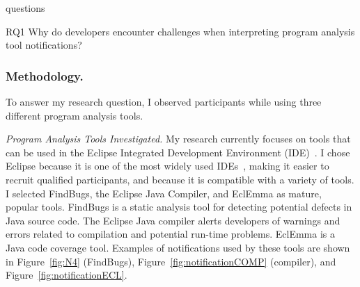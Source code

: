 \documentclass{llncs}
\begin{document}
\begin{labeling}{questions}
	\item [RQ1] Why do developers encounter challenges when interpreting program analysis tool notifications? 
\end{labeling}



\subsubsection{Methodology.} To answer my research question, I observed participants while using three different program analysis tools.

\vspace{0.5em}
\noindent\textit{Program Analysis Tools Investigated.}
My research currently focuses on tools that can be used in the Eclipse Integrated Development Environment (IDE)~\cite{EclipseIDE}. I chose Eclipse because it is one of the most widely used IDEs~\cite{Goth:2005:Beware}, making it easier to recruit qualified participants, and because it is compatible with a variety of tools. I selected FindBugs, the Eclipse Java Compiler, and EclEmma as mature, popular tools. FindBugs is a static analysis tool for detecting potential defects in Java source code. The Eclipse Java compiler alerts developers of warnings and errors related to compilation and potential run-time problems. EclEmma is a Java code coverage tool. Examples of notifications used by these tools are shown in Figure~\ref{fig:N4} (FindBugs), Figure~\ref{fig:notificationCOMP} (compiler), and Figure~\ref{fig:notificationECL}.
\end{document}
